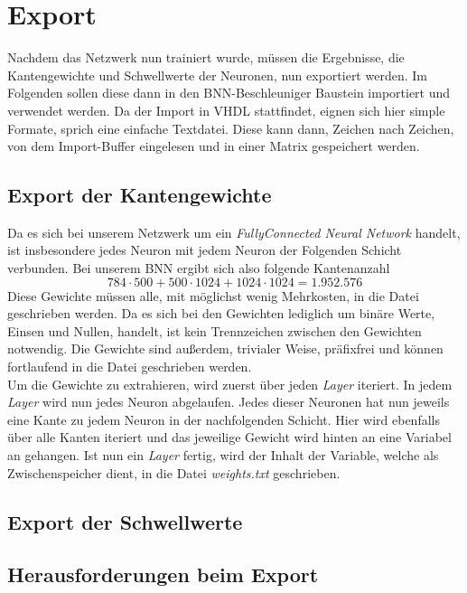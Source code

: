 \chapter{Export}
Nachdem das Netzwerk nun trainiert wurde, müssen die Ergebnisse, die Kantengewichte und Schwellwerte der Neuronen, nun exportiert werden. Im Folgenden sollen diese dann in den BNN-Beschleuniger Baustein importiert und verwendet werden. Da der Import in VHDL stattfindet, eignen sich hier simple Formate, sprich eine einfache Textdatei. Diese kann dann, Zeichen nach Zeichen, von dem Import-Buffer eingelesen und in einer Matrix gespeichert werden.
\section{Export der Kantengewichte}
Da es sich bei unserem Netzwerk um ein \textit{FullyConnected Neural Network} handelt, ist insbesondere jedes Neuron mit jedem Neuron der Folgenden Schicht verbunden. Bei unserem BNN ergibt sich also folgende Kantenanzahl
\[784 \cdot 500 + 500 \cdot 1024 + 1024 \cdot 1024 = 1.952.576 \]
Diese Gewichte müssen alle, mit möglichst wenig Mehrkosten, in die Datei geschrieben werden. Da es sich bei den Gewichten lediglich um binäre Werte, Einsen und Nullen, handelt, ist kein Trennzeichen zwischen den Gewichten notwendig. Die Gewichte sind außerdem, trivialer Weise, präfixfrei und können fortlaufend in die Datei geschrieben werden.\\
Um die Gewichte zu extrahieren, wird zuerst über jeden \textit{Layer} iteriert. In jedem \textit{Layer} wird nun jedes Neuron abgelaufen. Jedes dieser Neuronen hat nun jeweils eine Kante zu jedem Neuron in der nachfolgenden Schicht. Hier wird ebenfalls über alle Kanten iteriert und das jeweilige Gewicht wird hinten an eine Variabel an gehangen. Ist nun ein \textit{Layer} fertig, wird der Inhalt der Variable, welche als Zwischenspeicher dient, in die Datei \textit{weights.txt} geschrieben.
\section{Export der Schwellwerte}
\section{Herausforderungen beim Export}